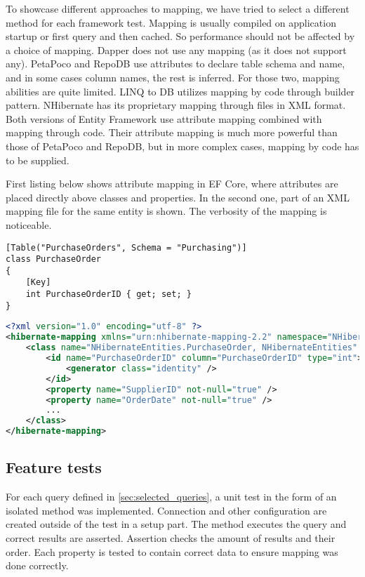 To showcase different approaches to mapping, we have tried to select a different method for each framework test. Mapping is usually compiled on application startup or first query and then cached. So performance should not be affected by a choice of mapping. Dapper does not use any mapping (as it does not support any). PetaPoco and RepoDB use attributes to declare table schema and name, and in some cases column names, the rest is inferred. For those two, mapping abilities are quite limited. LINQ to DB utilizes mapping by code through builder pattern. NHibernate has its proprietary mapping through files in XML format. Both versions of Entity Framework use attribute mapping combined with mapping through code. Their attribute mapping is much more powerful than those of PetaPoco and RepoDB, but in more complex cases, mapping by code has to be supplied.

First listing below shows attribute mapping in EF Core, where attributes are placed directly above classes and properties. In the second one, part of an XML mapping file for the same entity is shown. The verbosity of the mapping is noticeable.

\begin{lstlisting}[language=CSharp,basicstyle=\ttfamily\footnotesize]
[Table("PurchaseOrders", Schema = "Purchasing")]
class PurchaseOrder
{
    [Key]
    int PurchaseOrderID { get; set; }
}
\end{lstlisting}

\begin{lstlisting}[language=xml,basicstyle=\ttfamily\footnotesize]
<?xml version="1.0" encoding="utf-8" ?>
<hibernate-mapping xmlns="urn:nhibernate-mapping-2.2" namespace="NHibernateEntities">
    <class name="NHibernateEntities.PurchaseOrder, NHibernateEntities" table="PurchaseOrders" schema="Purchasing">
        <id name="PurchaseOrderID" column="PurchaseOrderID" type="int">
            <generator class="identity" />
        </id>
        <property name="SupplierID" not-null="true" />
        <property name="OrderDate" not-null="true" />
        ...
    </class>
</hibernate-mapping>
\end{lstlisting}

\subsection{Feature tests}

For each query defined in \autoref{sec:selected_queries}, a unit test in the form of an isolated method was implemented. Connection and other configuration are created outside of the test in a setup part. The method executes the query and correct results are asserted. Assertion checks the amount of results and their order. Each property is tested to contain correct data to ensure mapping was done correctly.

